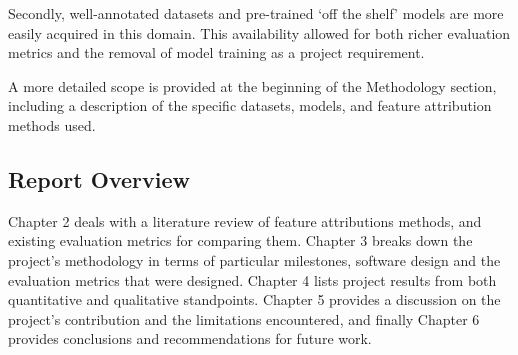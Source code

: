 \documentclass[main]{subfiles}
\begin{document}
Secondly, well-annotated datasets and pre-trained `off the shelf' models are more easily acquired in this domain. This availability allowed for both richer evaluation metrics and the removal of model training as a project requirement.

A more detailed scope is provided at the beginning of the Methodology section, including a description of the specific datasets, models, and feature attribution methods used.


\subsection*{Report Overview}

Chapter 2 deals with a literature review of feature attributions methods, and existing evaluation metrics for comparing them. Chapter 3 breaks down the project's methodology in terms of particular milestones, software design and the evaluation metrics that were designed. Chapter 4 lists project results from both quantitative and qualitative standpoints. Chapter 5 provides a discussion on the project's contribution and the limitations encountered, and finally Chapter 6 provides conclusions and recommendations for future work. 
\end{document}
